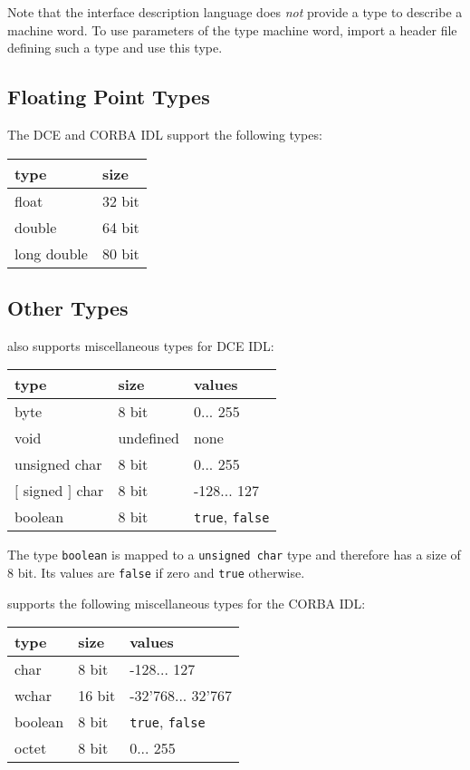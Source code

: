 Note that the interface description language does \emph{not} provide a type to
describe a machine word. To use parameters of the type machine word, import a
header file defining such a type and use this type.

\subsection{Floating Point Types}
The DCE and CORBA IDL support the following types:


\begin{center}
\begin{tabular}{|l|l|}
\hline
type & size \\ \hline
float & 32 bit \\
double & 64 bit \\
long double & 80 bit \\
\hline
\end{tabular}
\end{center}

\subsection{Other Types}

\dice{} also supports miscellaneous types for DCE IDL:

\begin{center}
\begin{tabular}{|l|l|l|}
\hline
type & size & values \\
\hline
byte & 8 bit & 0... 255 \\
void & undefined & none \\
unsigned char & 8 bit & 0... 255 \\
$[$ signed $]$ char & 8 bit & -128... 127 \\
boolean & 8 bit & {\tt true}, {\tt false} \\
\hline
\end{tabular}
\end{center}

The type {\tt boolean} is mapped to a {\tt unsigned char} type and therefore
has a size of 8 bit. Its values are {\tt false} if zero and {\tt true}
otherwise.

\dice{} supports the following miscellaneous types for the
CORBA IDL:

\begin{center}
\begin{tabular}{|l|l|l|}
\hline
type & size & values \\
\hline
char & 8 bit & -128... 127 \\
wchar & 16 bit & -32'768... 32'767 \\
boolean & 8 bit & {\tt true}, {\tt false} \\
octet & 8 bit & 0... 255 \\
\hline
\end{tabular}
\end{center}

